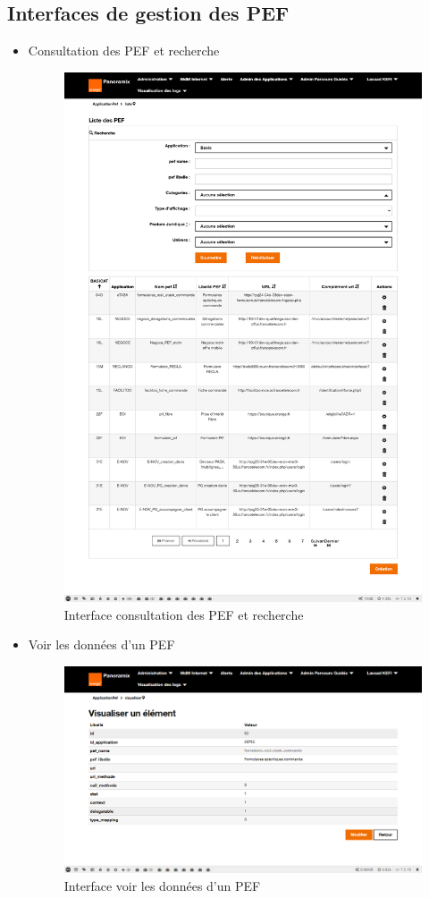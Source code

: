 \subsection{Interfaces de gestion des PEF}
\begin{itemize}
	\item Consultation des PEF et recherche
	\begin{figure}[H]
		\centering
		\includegraphics[width=0.55\linewidth]{img/screenshots/pef/index}
		\caption[Interface consultation des PEF et recherche]{Interface consultation des PEF et recherche}
		\label{fig:index-pef}
	\end{figure}

	\item Voir les données d'un PEF
	\begin{figure}[H]
		\centering
		\includegraphics[width=0.55\linewidth]{img/screenshots/pef/view}
		\caption[Interface voir les données d'un PEF]{Interface voir les données d'un PEF}
		\label{fig:view-pef}
	\end{figure}
	

\end{itemize}
